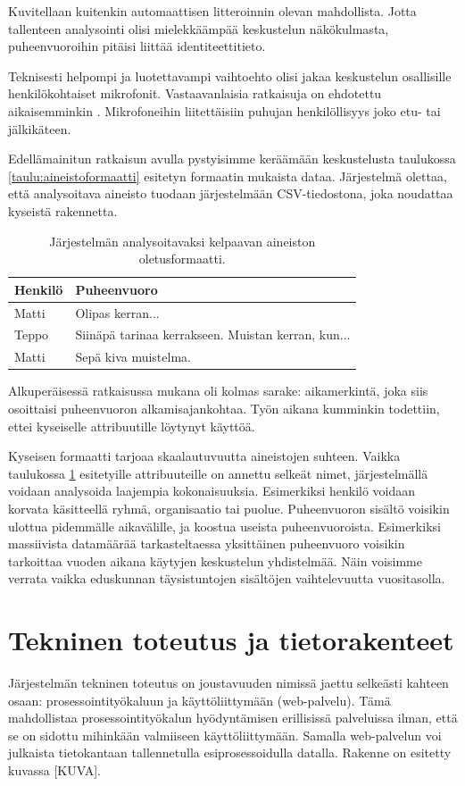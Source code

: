 \documentclass[11pt,a4paper,oneside]{memoir}
\begin{document}
Kuvitellaan kuitenkin automaattisen litteroinnin olevan mahdollista. Jotta tallenteen analysointi olisi mielekkäämpää keskustelun näkökulmasta, puheenvuoroihin pitäisi liittää identiteettitieto.

Teknisesti helpompi ja luotettavampi vaihtoehto olisi jakaa keskustelun osallisille henkilökohtaiset mikrofonit. Vastaavanlaisia ratkaisuja on ehdotettu aikaisemminkin \cite{visualizing-audio-in-group-table-conversation}. Mikrofoneihin liitettäisiin puhujan henkilöllisyys joko etu- tai jälkikäteen.

Edellämainitun ratkaisun avulla pystyisimme keräämään keskustelusta taulukossa \ref{taulu:aineistoformaatti} esitetyn formaatin mukaista dataa. Järjestelmä olettaa, että analysoitava aineisto tuodaan järjestelmään CSV-tiedostona, joka noudattaa kyseistä rakennetta.

\begin{table}[H]
\centering
\begin{tabular}{| l | l |}
\hline
Henkilö & Puheenvuoro \\ \hline
Matti & Olipas kerran... \\ \hline
Teppo & Siinäpä tarinaa kerrakseen. Muistan kerran, kun... \\ \hline
Matti & Sepä kiva muistelma. \\ \hline
\end{tabular}
\caption{Järjestelmän analysoitavaksi kelpaavan aineiston oletusformaatti.}
\label{taulukko:aineistoformaatti}
\end{table}

Alkuperäisessä ratkaisussa mukana oli kolmas sarake: aikamerkintä, joka siis osoittaisi puheenvuoron alkamisajankohtaa. Työn aikana kumminkin todettiin, ettei kyseiselle attribuutille löytynyt käyttöä.

Kyseisen formaatti tarjoaa skaalautuvuutta aineistojen suhteen. Vaikka taulukossa \ref{taulukko:aineistoformaatti} esitetyille attribuuteille on annettu selkeät nimet, järjestelmällä voidaan analysoida laajempia kokonaisuuksia. Esimerkiksi  henkilö voidaan korvata käsitteellä ryhmä, organisaatio tai puolue. Puheenvuoron sisältö voisikin ulottua pidemmälle aikavälille, ja koostua useista puheenvuoroista. Esimerkiksi massiivista datamäärää tarkasteltaessa yksittäinen puheenvuoro voisikin tarkoittaa vuoden aikana käytyjen keskustelun yhdistelmää. Näin voisimme verrata vaikka eduskunnan täysistuntojen sisältöjen vaihtelevuutta vuositasolla. 

\chapter{Tekninen toteutus ja tietorakenteet}
Järjestelmän tekninen toteutus on joustavuuden nimissä jaettu selkeästi kahteen osaan: prosessointityökaluun ja käyttöliittymään (web-palvelu). Tämä mahdollistaa prosessointityökalun hyödyntämisen erillisissä palveluissa ilman, että se on sidottu mihinkään valmiiseen käyttöliittymään. Samalla web-palvelun voi julkaista tietokantaan tallennetulla esiprosessoidulla datalla. Rakenne on esitetty kuvassa [KUVA].
\end{document}
